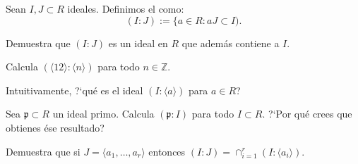 \begin{problem}
{}
Sean $I, J\subset R$ ideales. Definimos el  como:
$$(I:J):=\{a\in R: aJ\subset I).$$

\ppart Demuestra que $(I:J)$ es un ideal en $R$ que además contiene a $I$.

\ppart Calcula $(\langle 12\rangle : \langle n \rangle)$ para todo  $n\in {\mathbb Z}$.

\ppart Intuitivamente,  ?`qué es el ideal $(I: \langle a\rangle)$ para $a\in R$?

\ppart Sea ${\mathfrak p}\subset R$ un ideal primo. Calcula $({\mathfrak p}: I)$ para todo $I\subset R$.
?`Por qué crees que obtienes ése   resultado?

\ppart Demuestra que si $J=\langle a_1,\ldots, a_r\rangle$ entonces $(I:J)=\cap_{i=1}^r(I: \langle a_i\rangle).$
\solution
\end{problem}
